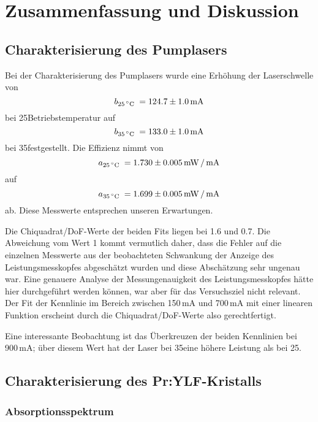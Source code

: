 \section{Zusammenfassung und Diskussion}

\subsection{Charakterisierung des Pumplasers}

Bei der Charakterisierung des Pumplasers wurde eine Erhöhung der Laserschwelle von
\begin{equation*}
b_{25\text{\,$^\circ$C }} = 124.7\pm1.0\,\text{mA}
\end{equation*}
bei 25\grad Betriebstemperatur auf
\begin{equation*}
b_{35\text{\,$^\circ$C }} = 133.0\pm1.0\,\text{mA}
\end{equation*}
bei 35\grad festgestellt.
Die Effizienz nimmt von
\begin{equation*}
a_{25\text{\,$^\circ$C }} = 1.730\pm0.005\,\text{mW\,/\,mA}
\end{equation*}
auf
\begin{equation*}
a_{35\text{\,$^\circ$C }} = 1.699\pm0.005\,\text{mW\,/\,mA}
\end{equation*}
ab.
Diese Messwerte entsprechen unseren Erwartungen.

Die Chiquadrat/DoF-Werte der beiden Fits liegen bei 1.6 und 0.7.
Die Abweichung vom Wert 1 kommt vermutlich daher,
dass die Fehler auf die einzelnen Messwerte aus der beobachteten Schwankung der Anzeige des
Leistungsmesskopfes abgeschätzt wurden und diese Abschätzung sehr ungenau war.
Eine genauere Analyse der Messungenauigkeit des Leistungsmesskopfes hätte hier durchgeführt werden
können, war aber für das Versuchsziel nicht relevant.
Der Fit der Kennlinie im Bereich zwischen 150\,mA und 700\,mA mit einer linearen Funktion erscheint
durch die Chiquadrat/DoF-Werte also gerechtfertigt.

Eine interessante Beobachtung ist das Überkreuzen der beiden Kennlinien bei 900\,mA;
über diesem Wert hat der Laser bei 35\grad eine höhere Leistung als bei 25\grad.

\subsection{Charakterisierung des Pr:YLF-Kristalls}

\subsubsection{Absorptionsspektrum}

